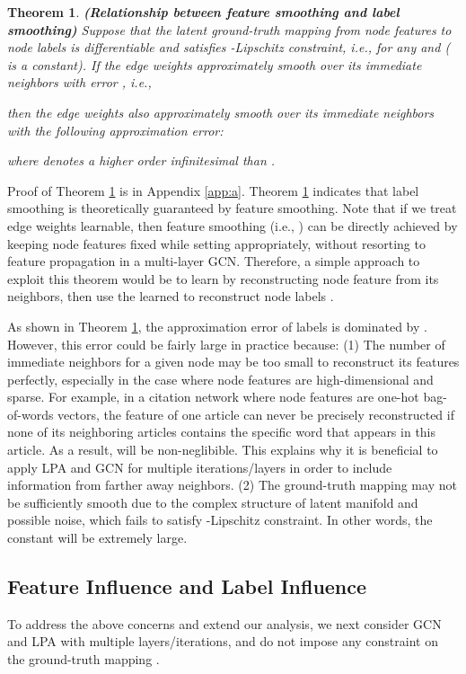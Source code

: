 \documentclass{article}
\newtheorem{theorem}{Theorem}
\begin{document}
		\begin{theorem}
		\label{thm:smoothing}
			\rm\textbf{(Relationship between feature smoothing and label smoothing)}
			Suppose that the latent ground-truth mapping  from node features to node labels is differentiable and satisfies -Lipschitz constraint, i.e.,  for any  and  ( is a constant).
			If the edge weights  approximately smooth  over its immediate neighbors with error , i.e.,
			
			then the edge weights  also approximately smooth  over its immediate neighbors with the following approximation error:
			
			where  denotes a higher order infinitesimal than .
		\end{theorem}
		
		Proof of Theorem \ref{thm:smoothing} is in Appendix \ref{app:a}.
		Theorem \ref{thm:smoothing} indicates that label smoothing is theoretically guaranteed by feature smoothing.
		Note that if we treat edge weights  learnable, then feature smoothing (i.e., ) can be directly achieved by keeping node features  fixed while setting  appropriately, without resorting to feature propagation in a multi-layer GCN.
		Therefore, a simple approach to exploit this theorem would be to learn  by reconstructing node feature  from its neighbors, then use the learned  to reconstruct node labels  \citep{karasuyama2013manifold}.


		As shown in Theorem \ref{thm:smoothing}, the approximation error of labels is dominated by .
		However, this error could be fairly large in practice because:
		(1) The number of immediate neighbors for a given node may be too small to reconstruct its features perfectly, especially in the case where node features are high-dimensional and sparse.
		For example, in a citation network where node features are one-hot bag-of-words vectors, the feature of one article can never be precisely reconstructed if none of its neighboring articles contains the specific word that appears in this article.
		As a result,  will be non-neglibible.
		This explains why it is beneficial to apply LPA and GCN for multiple iterations/layers in order to include information from farther away neighbors.
		(2) The ground-truth mapping  may not be sufficiently smooth due to the complex structure of latent manifold and possible noise, which fails to satisfy -Lipschitz constraint.
		In other words, the constant  will be extremely large.
		
	\subsection{Feature Influence and Label Influence}
	    To address the above concerns and extend our analysis, we next consider GCN and LPA with multiple layers/iterations, and do not impose any constraint on the ground-truth mapping .
		
\end{document}
